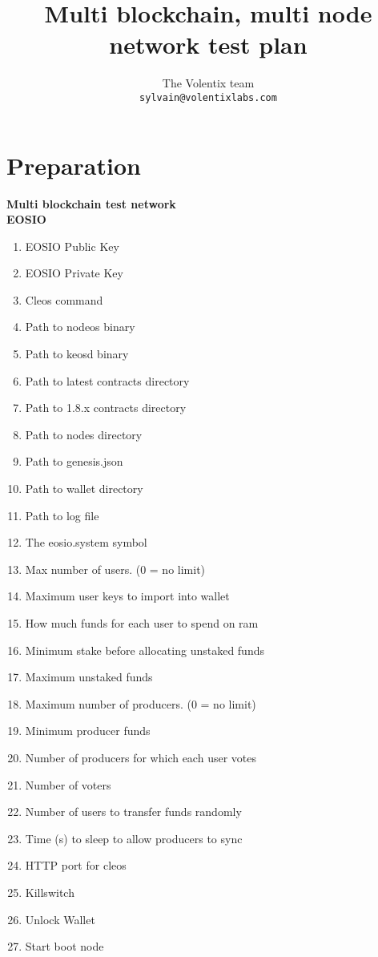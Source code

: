 \documentclass[]{article}
\title{Multi blockchain, multi node network test plan}
\author{
		The Volentix team\\
	\texttt{sylvain@volentixlabs.com}
}
\begin{document}
\maketitle


\section{Preparation}

\textbf{Multi blockchain test network}  \\		   
   \textbf{EOSIO} 
   \begin{enumerate}
		\item EOSIO Public Key
		\item EOSIO Private Key
		\item Cleos command
		\item Path to nodeos binary
		\item Path to keosd binary
		\item Path to latest contracts directory
		\item Path to 1.8.x contracts directory
		\item Path to nodes directory
		\item Path to genesis.json
		\item Path to wallet directory
		\item Path to log file
		\item The eosio.system symbol
		\item Max number of users. (0 = no limit)
		\item Maximum user keys to import into wallet
		\item How much funds for each user to spend on ram
		\item Minimum stake before allocating unstaked funds
		\item Maximum unstaked funds
		\item Maximum number of producers. (0 = no limit)
		\item Minimum producer funds
		\item Number of producers for which each user votes
		\item Number of voters
		\item Number of users to transfer funds randomly 
		\item Time (s) to sleep to allow producers to sync
		\item HTTP port for cleos
		\item Killswitch
		\item Unlock Wallet
		\item Start boot node

\end{enumerate}
\end{document}
